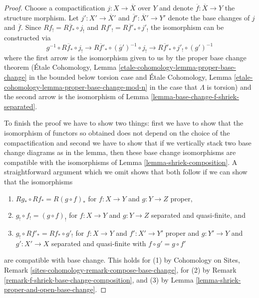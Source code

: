 \begin{proof}
Choose a compactification $j : X \to \overline{X}$ over $Y$
and denote $\overline{f} : \overline{X} \to Y$ the structure morphism.
Let $j' : X' \to \overline{X}'$ and $\overline{f}' : \overline{X}' \to Y'$
denote the base changes of $j$ and $\overline{f}$.
Since $Rf_! = R\overline{f}_* \circ j_!$ and $Rf'_! =
R\overline{f}'_* \circ j'_!$ the isomorphism can be constructed via
$$
g^{-1} \circ R\overline{f}_* \circ j_! \to
R\overline{f}'_* \circ (\overline{g}')^{-1} \circ j_! \to
R\overline{f}'_* \circ j'_! \circ (g')^{-1} 
$$
where the first arrow is the isomorphism given to us by the
proper base change theorem (\'Etale Cohomology, Lemma
\ref{etale-cohomology-lemma-proper-base-change} in the bounded below torsion
case and \'Etale Cohomology, Lemma
\ref{etale-cohomology-lemma-proper-base-change-mod-n} in the
case that $\Lambda$ is torsion) and the second arrow is the isomorphism of
Lemma \ref{lemma-base-change-f-shriek-separated}.

\medskip\noindent
To finish the proof we have to show two things: first we have to show
that the isomorphism of functors so obtained does not depend on
the choice of the compactification and second we have to show that
if we vertically stack two base change diagrams as in the lemma, then
these base change isomorphisms are compatible with the isomorphisms
of Lemma \ref{lemma-shriek-composition}.
A straightforward argument which we omit shows that both follow
if we can show that the isomorphisms
\begin{enumerate}
\item $Rg_* \circ Rf_* = R(g \circ f)_*$ for $f : X \to Y$ and $g : Y \to Z$
proper,
\item $g_! \circ f_! = (g \circ f)_!$ for $f : X \to Y$ and $g : Y \to Z$
separated and quasi-finite, and
\item $g_! \circ Rf'_* = Rf_* \circ g'_!$ for  $f : X \to Y$ and
$f' : X' \to Y'$ proper and $g : Y' \to Y$ and $g' : X' \to X$
separated and quasi-finite with $f \circ g' = g \circ f'$
\end{enumerate}
are compatible with base change. This holds for (1) by
Cohomology on Sites, Remark \ref{sites-cohomology-remark-compose-base-change},
for (2) by Remark \ref{remark-f-shriek-base-change-composition}, and
(3) by Lemma \ref{lemma-shriek-proper-and-open-base-change}.
\end{proof}

